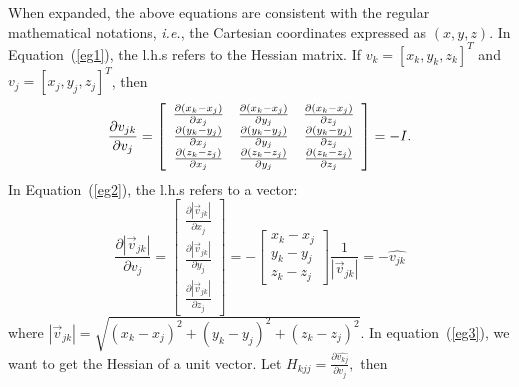 \documentclass[11pt]{article}
\newcommand{\hatv}[1]{\mbox{$\hat{{v}_{#1}}$}}
\newcommand{\AbsVv}[1]{\mbox{$\left| \vec{v}_{#1} \right| $}}
\begin{document}
When expanded, the above equations are consistent with the regular
mathematical notations, {\it i.e.}, the Cartesian coordinates
expressed as $(x, y, z)$. In Equation~({\ref{eg1}}), the l.h.s refers
to the Hessian matrix. If $v_k = [x_k, y_k, z_k]^T$ and $v_j = [x_j,
y_j, z_j]^T$, then
\begin{equation}
\frac{\partial v_{jk}} {\partial{v_j}} = 
\left[ \begin{array}{ccc}
\frac{\partial (x_k - x_j)} {\partial x_j} & 
\frac{\partial (x_k - x_j)} {\partial y_j} &
\frac{\partial (x_k - x_j)} {\partial z_j} \\
\frac{\partial (y_k - y_j)} {\partial x_j} & 
\frac{\partial (y_k - y_j)} {\partial y_j} &
\frac{\partial (y_k - y_j)} {\partial z_j} \\
\frac{\partial (z_k - z_j)} {\partial x_j} & 
\frac{\partial (z_k - z_j)} {\partial y_j} &
\frac{\partial (z_k - z_j)} {\partial z_j} 
\end{array}
\right] = - I. \\
\end{equation}
In Equation~(\ref{eg2}), the l.h.s refers to a vector:
\begin{equation}
\frac{\partial \AbsVv{jk}} {\partial{v_j}} = 
\left[ \begin{array}{r}
\frac{\partial \AbsVv{jk}}{\partial x_j} \\
\frac{\partial \AbsVv{jk}}{\partial y_j}\\
\frac{\partial \AbsVv{jk}}{\partial z_j}
\end{array}
\right] = 
- \left[ \begin{array}{r}
x_k-x_j \\
y_k-y_j \\
z_k-z_j  
\end{array}
\right]
\frac{1}{\AbsVv{jk}} = - \hatv{jk}
\end{equation}
where $\AbsVv{jk} = \sqrt{(x_k-x_j)^2+(y_k-y_j)^2+(z_k-z_j)^2}.$
In equation~({\ref{eg3}}), we want to get the Hessian of a unit
vector. Let $H_{kjj} = \frac{\partial \hatv{kj}}{\partial{v_j}},$ then
\end{document}
